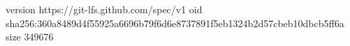 version https://git-lfs.github.com/spec/v1
oid sha256:360a8489d4f55925a6696b79f6d6e8737891f5eb1324b2d57cbeb10dbcb5ff6a
size 349676
